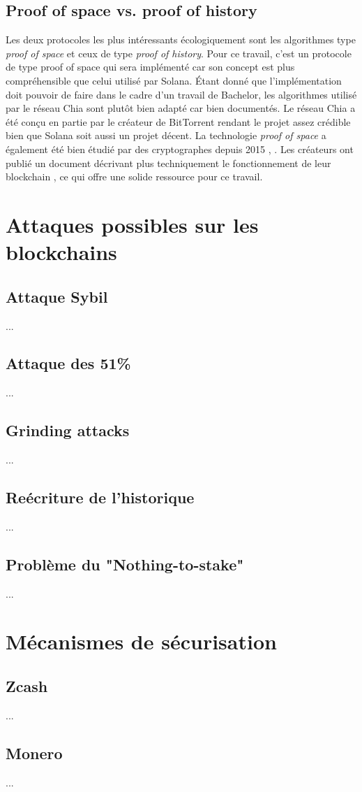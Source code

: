 \subsection{Proof of space vs. proof of history}

Les deux protocoles les plus intéressants écologiquement sont les algorithmes type \textit{proof of space} et ceux de type \textit{proof of history}. Pour ce travail, c'est un protocole de type proof of space qui sera implémenté car son concept est plus compréhensible que celui utilisé par Solana. Étant donné que l'implémentation doit pouvoir de faire dans le cadre d'un travail de Bachelor, les algorithmes utilisé par le réseau Chia sont plutôt bien adapté car bien documentés. Le réseau Chia a été conçu en partie par le créateur de BitTorrent rendant le projet assez crédible bien que Solana soit aussi un projet décent. La technologie \textit{proof of space} a également été bien étudié par des cryptographes depuis 2015 \cite{DBLP:conf/crypto/DziembowskiFKP15}, \cite{DBLP:conf/asiacrypt/AbusalahACKPR17}. Les créateurs ont publié un document décrivant plus techniquement le fonctionnement de leur blockchain \cite{chia:greenpaper}, ce qui offre une solide ressource pour ce travail.

\section{Attaques possibles sur les blockchains}

\subsection{Attaque Sybil}
...
\subsection{Attaque des 51\%}
...
\subsection{Grinding attacks}
...
\subsection{Reécriture de l'historique}
...
\subsection{Problème du "Nothing-to-stake"}
...

\section{Mécanismes de sécurisation}

\subsection{Zcash}
...
\subsection{Monero}
...